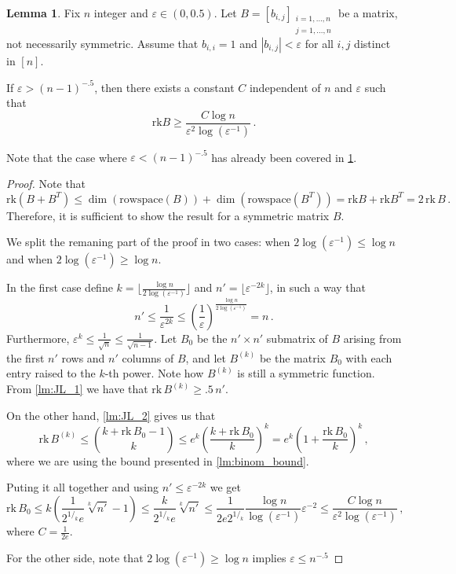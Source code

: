 \documentclass[12pt]{amsart}
\theoremstyle{definition}
\newtheorem{lm}[thm]{Lemma}
\newcommand{\rk}{\mathrm{rk}}
\begin{document}
\begin{lm}\label{lm:JL_3}
Fix $n$ integer and $\varepsilon \in (0, 0.5)$.
Let $B = [b_{i, j}]_{\substack{i = 1, \ldots , n \\ j = 1, \ldots , n}}$ be a matrix, not necessarily symmetric.
Assume that $b_{i, i} = 1$ and $|b_{i, j}| < \varepsilon $ for all $i, j$ distinct in $[n]$.

If $\varepsilon > (n-1)^{-.5}$, then there exists a constant $C$ independent of $n$ and $\varepsilon$ such that 
$$ \rk B \geq \frac{C \log n}{\varepsilon^2 \log (\varepsilon^{-1})}\, . $$
\end{lm}

Note that the case where $\varepsilon < (n-1)^{-.5}$ has already been covered in \cref{lm:JL_3}.

\begin{proof}
Note that 
$$\rk(B + B^T) \leq \dim( \mathrm{rowspace}(B) ) + \dim( \mathrm{rowspace}(B^T) ) =  \rk B + \rk B^T  = 2 \, \rk \, B\, . $$ 
Therefore, it is sufficient to show the result for a symmetric matrix $B$.

We split the remaning part of the proof in two cases: when $2 \log(\varepsilon^{-1}) \leq \log n$ and when $2 \log(\varepsilon^{-1}) \geq \log n$.

In the first case define $k = \lfloor \frac{\log n}{2 \log ( \varepsilon^{-1})} \rfloor$ and $n' = \lfloor \varepsilon^{-2k} \rfloor$, in such a way that 
$$ n' \leq \frac{1}{\varepsilon^{2k}} \leq \left( \frac{1}{\varepsilon} \right)^{\frac{\log n}{2 \log(\varepsilon^{-1})}} = n\, . $$
Furthermore, $\varepsilon^k \leq \frac{1}{\sqrt{n}} \leq \frac{1}{\sqrt{n-1}}$.
Let $B_0$ be the $n'\times n'$ submatrix of $B$ arising from the first $n'$ rows and $n'$ columns of $B$, and let $B^{(k)}$ be the matrix $B_0$ with each entry raised to the $k$-th power.
Note how $B^{(k)}$ is still a symmetric function.
From \cref{lm:JL_1} we have that $\rk \, B^{(k)} \geq .5 \, n'$.

On the other hand, \cref{lm:JL_2} gives us that 
$$\rk \, B^{(k)} \leq \binom{k + \rk\, B_0 - 1}{k} \leq e^k \left( \frac{k + \rk \, B_0}{k}\right)^k =  e^k \left(1 +  \frac{\rk \, B_0}{k}\right)^k\, , $$
where we are using the bound presented in \cref{lm:binom_bound}.

Puting it all together and using $n' \leq \varepsilon^{-2k}$ we get 
$$ \rk \, B_0 \leq k \left( \frac{1}{2^{1/_k} e} \sqrt[k]{n'} - 1\right)  \leq  \frac{k}{2^{1/_k} e} \sqrt[k]{n'} \leq \frac{1}{2e  2^{1/_k} }\frac{\log n}{\log(\varepsilon^{-1})}\varepsilon^{-2} \leq \frac{C \log n}{\varepsilon^2 \log(\varepsilon^{-1})}\, , $$
where $C = \frac{1}{2e}$.

For the other side, note that $2 \log(\varepsilon^{-1}) \geq \log n$ implies $\varepsilon \leq n^{-.5}$
\end{proof}
\end{document}
